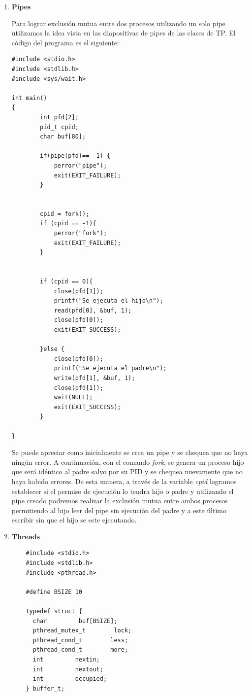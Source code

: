 \documentclass[a4paper,11pt] {article}
\begin{document}
\begin{enumerate}

	\item \textbf{Pipes}

	Para lograr exclusi\'on mutua entre dos procesos utilizando un solo pipe utilizamos la idea vista en las diapositivas de pipes de las clases de TP. El c\'odigo del programa es el siguiente:
	\begin{verbatim}
#include <stdio.h>
#include <stdlib.h>
#include <sys/wait.h>

int main()
{
        int pfd[2];
        pid_t cpid;
        char buf[80];

        if(pipe(pfd)== -1) {
            perror("pipe");
            exit(EXIT_FAILURE);
        }


        cpid = fork();
        if (cpid == -1){
            perror("fork");
            exit(EXIT_FAILURE);
        }


        if (cpid == 0){
            close(pfd[1]);
            printf("Se ejecuta el hijo\n");
            read(pfd[0], &buf, 1);
            close(pfd[0]);
            exit(EXIT_SUCCESS);

        }else {
            close(pfd[0]);
            printf("Se ejecuta el padre\n");
            write(pfd[1], &buf, 1);
            close(pfd[1]);
            wait(NULL);
            exit(EXIT_SUCCESS);
        }

}
	\end{verbatim}

	Se puede apreciar como inicialmente se crea un pipe y se chequea que no haya ning\'un error. A continuaci\'on, con el comando \textit{fork}, se genera un proceso hijo que ser\'a id\'entico al padre salvo por su PID y se chequea nuevamente que no haya habido errores. De esta manera, a trav\'es de la variable \textit{cpid} logramos establecer si el permiso de ejecuci\'on lo tendra hijo o padre y utilizando el pipe creado podremos realizar la exclusi\'on mutua entre ambos procesos permitiendo al hijo leer del pipe sin ejecuci\'on del padre y a este \'ultimo escribir sin que el hijo se este ejecutando.

	\item \textbf{Threads}

	\begin{verbatim}
	#include <stdio.h>
	#include <stdlib.h>
	#include <pthread.h>
	
	#define BSIZE 10
	
	typedef struct {
	  char         buf[BSIZE];
	  pthread_mutex_t        lock;
	  pthread_cond_t        less;
	  pthread_cond_t        more;
	  int         nextin;
	  int         nextout;
	  int         occupied;
	} buffer_t;
	

\end{verbatim}
\end{enumerate}
\end{document}
